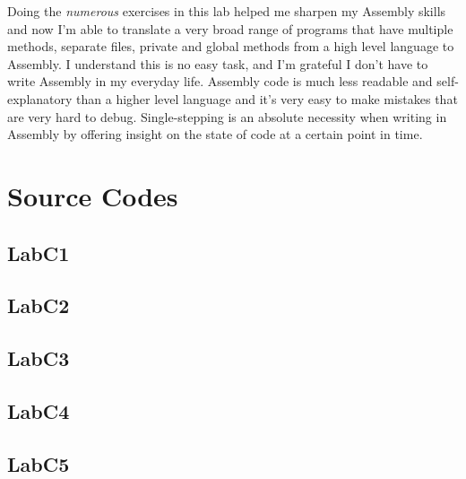 \documentclass{article}
\begin{document}
Doing the \textit{numerous} exercises in this lab helped me sharpen my Assembly skills and now I'm able to translate a very broad range of programs that have multiple methods, separate files, private and global methods from a high level language to Assembly. I understand this is no easy task, and I'm grateful I don't have to write Assembly in my everyday life. Assembly code is much less readable and self-explanatory than a higher level language and it's very easy to make mistakes that are very hard to debug. Single-stepping is an absolute necessity when writing in Assembly by offering insight on the state of code at a certain point in time.



\section{Source Codes}


\subsection{LabC1}



\subsection{LabC2}



\subsection{LabC3}


\pagebreak

\subsection{LabC4}


\pagebreak

\subsection{LabC5}

\pagebreak

\pagebreak
\end{document}
